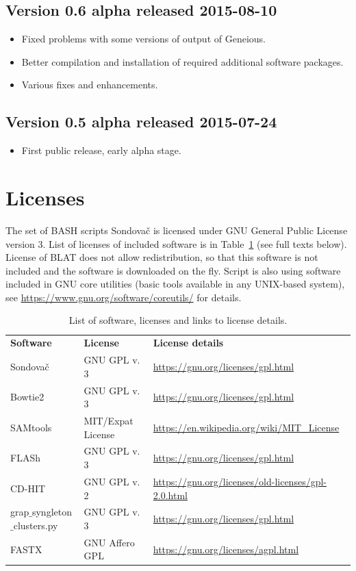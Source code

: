 \documentclass[a4paper, 11pt, twoside]{article}
\begin{document}
\subsection{Version 0.6 alpha released 2015-08-10}

\begin{itemize}
  \item Fixed problems with some versions of output of Geneious.
  \item Better compilation and installation of required additional software packages.
  \item Various fixes and enhancements.
\end{itemize}

\subsection{Version 0.5 alpha released 2015-07-24}

\begin{itemize}
  \item First public release, early alpha stage.
\end{itemize}

\section{Licenses}

The set of BASH scripts Sondovač is licensed under GNU General Public License version 3. List of licenses of included software is in Table~\ref{software-lic} (see full texts below). License of BLAT does not allow redistribution, so that this software is not included and the software is downloaded on the fly. Script is also using software included in GNU core utilities (basic tools available in any UNIX-based system), see \url{https://www.gnu.org/software/coreutils/} for details.

\begin{longtable}{| >{\centering\arraybackslash}m{2.5cm} >{\centering\arraybackslash}m{3.4cm} >{\centering\arraybackslash}m{8.8cm} |}
\caption[List of software and licenses]{List of software, licenses and links to license details.}\\
\hline
\endhead
\hline
\endfoot
\textbf{Software} & \textbf{License} & \textbf{License details}\\
Sondovač & GNU GPL v. 3 & \url{https://gnu.org/licenses/gpl.html}\\
Bowtie2 & GNU GPL v. 3 & \url{https://gnu.org/licenses/gpl.html}\\
SAMtools & MIT/Expat License & \url{https://en.wikipedia.org/wiki/MIT_License}\\
FLASh & GNU GPL v. 3 & \url{https://gnu.org/licenses/gpl.html}\\
CD-HIT & GNU GPL v. 2 & \url{https://gnu.org/licenses/old-licenses/gpl-2.0.html}\\
grap$\_$synglet\-on$\_$clusters.py & GNU GPL v. 3 & \url{https://gnu.org/licenses/gpl.html}\\
FASTX & GNU Affero GPL & \url{https://gnu.org/licenses/agpl.html}
\label{software-lic}
\end{longtable}
\end{document}
